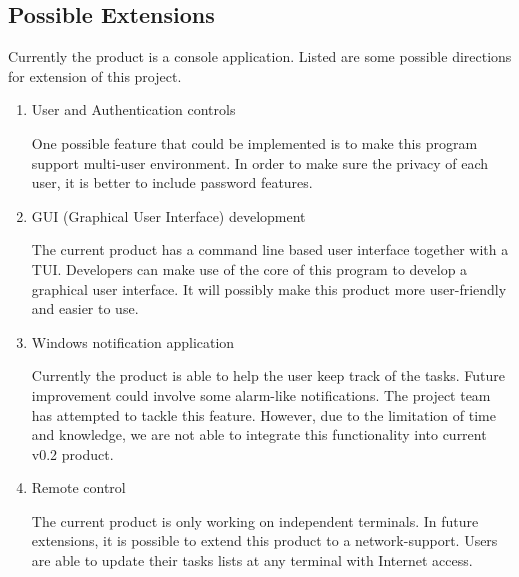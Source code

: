 \documentclass[12pt, a4paper]{article}
\begin{document}
\subsection{Possible Extensions}
Currently the product is a console application. Listed are some possible directions for extension
of this project.
\begin{enumerate}
\item User and Authentication controls

One possible feature that could be implemented is to make this program support multi-user
environment. In order to make sure the privacy of each user, it is better to include password
features.
\item GUI (Graphical User Interface) development

The current product has a command line based user interface together with a TUI.
Developers can make use of the core of this program to develop a graphical user interface. It
will possibly make this product more user-friendly and easier to use.
\item Windows notification application

Currently the product is able to help the user keep track of the tasks. Future improvement
could involve some alarm-like notifications. The project team has attempted to tackle this
feature. However, due to the limitation of time and knowledge, we are not able to integrate
this functionality into current v0.2 product.
\item Remote control

The current product is only working on independent terminals. In future extensions, it is
possible to extend this product to a network-support. Users are able to update their tasks
lists at any terminal with Internet access.
\end{enumerate}
\end{document}
